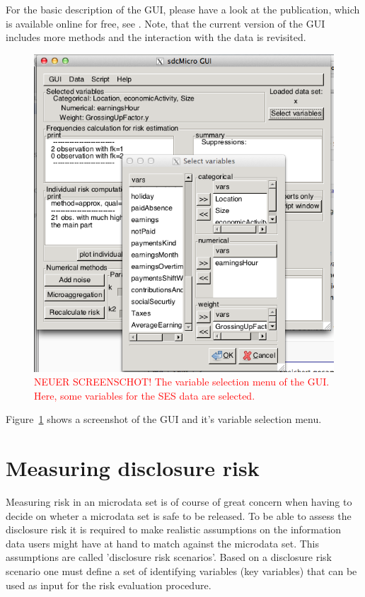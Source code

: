 \documentclass[12pt]{article}
\begin{document}
For the basic description of the GUI, please have a look at the publication,
 which is available online for free, 
 see \cite{Templ09tdp}. Note, that the current version of the GUI includes more methods and
 the interaction with the data is revisited.

\begin{figure}[ht]
\begin{center}
\includegraphics{gui1}
\caption{\label{fig:gui1}\textcolor{red}{NEUER SCREENSCHOT! The variable selection menu of the GUI. 
Here, some variables for the SES data are selected.}}
\end{center}
\end{figure}

Figure~\ref{fig:gui1} shows a screenshot of the GUI and it's variable selection menu. 



%


\section{Measuring disclosure risk}\label{method:risk_utility}
Measuring risk in an microdata set is of course of great concern 
when having to decide on wheter a 
microdata set is safe to be released. 
To be able to assess the disclosure risk it is required to make realistic assumptions on the information data users might have at hand to match against 
the microdata set. This assumptions are called 'disclosure risk scenarios'. Based on a disclosure 
risk scenario one must define a set of identifying variables (key variables) that can 
be used as input for the risk evaluation procedure. \\
\end{document}

